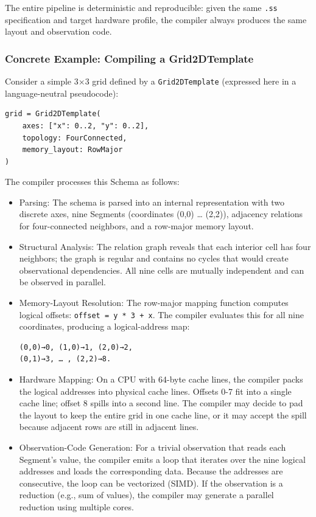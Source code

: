 \documentclass[
  a4paper,
  DIV=11,
  numbers=noendperiod]{scrartcl}
\begin{document}
The entire pipeline is deterministic and reproducible: given the same
\texttt{.ss} specification and target hardware profile, the compiler
always produces the same layout and observation code.

\subsubsection{Concrete Example: Compiling a
Grid2DTemplate}\label{concrete-example-compiling-a-grid2dtemplate}

Consider a simple 3×3 grid defined by a \texttt{Grid2DTemplate}
(expressed here in a language-neutral pseudocode):

\begin{verbatim}
grid = Grid2DTemplate(
    axes: ["x": 0..2, "y": 0..2],
    topology: FourConnected,
    memory_layout: RowMajor
)
\end{verbatim}

The compiler processes this Schema as follows:

\begin{itemize}
\item
  Parsing: The schema is parsed into an internal representation with two
  discrete axes, nine Segments (coordinates (0,0) \ldots{} (2,2)),
  adjacency relations for four-connected neighbors, and a row-major
  memory layout.
\item
  Structural Analysis: The relation graph reveals that each interior
  cell has four neighbors; the graph is regular and contains no cycles
  that would create observational dependencies. All nine cells are
  mutually independent and can be observed in parallel.
\item
  Memory-Layout Resolution: The row-major mapping function computes
  logical offsets: \texttt{offset\ =\ y\ *\ 3\ +\ x}. The compiler
  evaluates this for all nine coordinates, producing a logical-address
  map:

\begin{verbatim}
(0,0)→0, (1,0)→1, (2,0)→2,
(0,1)→3, … , (2,2)→8.
\end{verbatim}
\item
  Hardware Mapping: On a CPU with 64-byte cache lines, the compiler
  packs the logical addresses into physical cache lines. Offsets 0-7 fit
  into a single cache line; offset 8 spills into a second line. The
  compiler may decide to pad the layout to keep the entire grid in one
  cache line, or it may accept the spill because adjacent rows are still
  in adjacent lines.
\item
  Observation-Code Generation: For a trivial observation that reads each
  Segment's value, the compiler emits a loop that iterates over the nine
  logical addresses and loads the corresponding data. Because the
  addresses are consecutive, the loop can be vectorized (SIMD). If the
  observation is a reduction (e.g., sum of values), the compiler may
  generate a parallel reduction using multiple cores.
\end{itemize}
\end{document}
